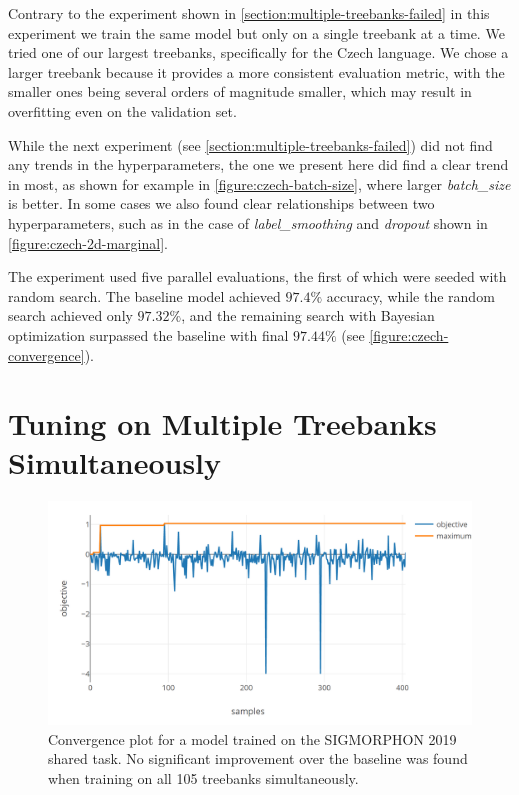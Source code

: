 Contrary to the experiment shown in \autoref{section:multiple-treebanks-failed} in this experiment we train the same model but only on a single treebank at a time. We tried one of our largest treebanks, specifically for the Czech language. We chose a larger treebank because it provides a more consistent evaluation metric, with the smaller ones being several orders of magnitude smaller, which may result in overfitting even on the validation set.

While the next experiment (see \autoref{section:multiple-treebanks-failed}) did not find any trends in the hyperparameters, the one we present here did find a clear trend in most, as shown for example in \autoref{figure:czech-batch-size}, where larger \emph{batch\_size} is better. In some cases we also found clear relationships between two hyperparameters, such as in the case of \emph{label\_smoothing} and \emph{dropout} shown in \autoref{figure:czech-2d-marginal}.

The experiment used five parallel evaluations, the first of which were seeded with random search. The baseline model achieved $97.4\%$ accuracy, while the random search achieved only $97.32\%$, and the remaining search with Bayesian optimization surpassed the baseline with final $97.44\%$ (see \autoref{figure:czech-convergence}).


\section{Tuning on Multiple Treebanks Simultaneously}
\label{section:multiple-treebanks-failed}

\begin{figure}[t]
	\begin{center}
		\includegraphics[width=1.0\textwidth]{images/sig-convergence.png}
		\caption{Convergence plot for a model trained on the SIGMORPHON 2019 shared task. No significant improvement over the baseline was found when training on all 105 treebanks simultaneously.}
		\label{figure:sigmorphon-convergence}
	\end{center}
\end{figure}

